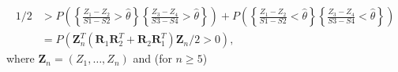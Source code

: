 \documentclass[12pt]{article}
\renewcommand{\P}{P}
\newcommand{\z}{Z}
\newcommand{\y}{Y}
\newcommand{\s}{S}
\newcommand{\x}{X}
\newcommand{\zvec}{\vec{Z}_n}
\renewcommand{\vec}[1]{\textbf{#1}}
\newcommand{\Svec}{\vec{R}}
\newcommand{\thetahat}{\hat{\theta}}
\newcommand{\zs}[2]{\frac{\z_{#1}-\z_{#2}}{\s{#1}-\s{#2}}}
\begin{document}
      \begin{align}
        1/2 &> \P\left(\left\{\zs{1}{2}>\thetahat\right\}\left\{\zs{3}{4}>\thetahat\right\}\right) + \P\left(\left\{\zs{1}{2}<\thetahat\right\}\left\{\zs{3}{4}<\thetahat\right\}\right)\\
            &= \P(\zvec^T(\Svec_1\Svec_2^T+\Svec_2\Svec_1^T)\zvec/2>0),
      \end{align}
      where $\zvec=(\z_1,\ldots,\z_n)$ and (for $n\ge 5$)
\end{document}
